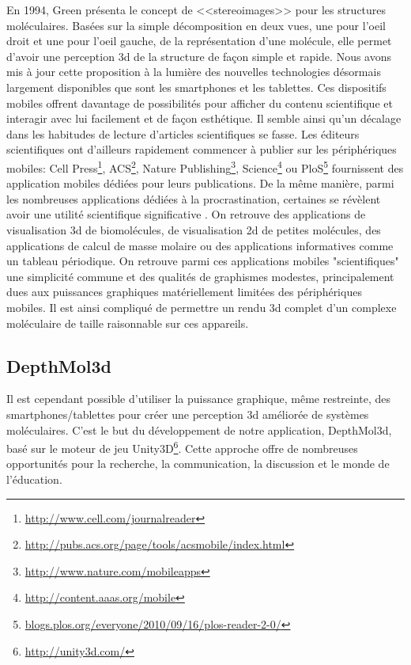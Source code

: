 En 1994, Green présenta le concept de <<stereoimages>> \cite{green_stereoimages_1994} pour les structures moléculaires. Basées sur la simple décomposition en deux vues, une pour l'oeil droit et une pour l'oeil gauche, de la représentation d'une molécule, elle permet d'avoir une perception 3d de la structure de façon simple et rapide. Nous avons mis à jour cette proposition à la lumière des nouvelles technologies désormais largement disponibles que sont les smartphones et les tablettes. Ces dispositifs mobiles offrent davantage de possibilités pour afficher du contenu scientifique et interagir avec lui facilement et de façon esthétique. Il semble ainsi qu'un décalage dans les habitudes de lecture d'articles scientifiques se fasse. Les éditeurs scientifiques ont d'ailleurs rapidement commencer à publier sur les périphériques mobiles: Cell Press\footnote{\url{http://www.cell.com/journalreader}}, ACS\footnote{\url{http://pubs.acs.org/page/tools/acsmobile/index.html}}, Nature Publishing\footnote{\url{http://www.nature.com/mobileapps}}, Science\footnote{\url{http://content.aaas.org/mobile}} ou PloS\footnote{\url{blogs.plos.org/everyone/2010/09/16/plos-reader-2-0/}} fournissent des application mobiles dédiées pour leurs publications. De la même manière, parmi les nombreuses applications dédiées à la procrastination, certaines se révèlent avoir une utilité scientifique significative \cite{powell_lab_2012}. On retrouve des applications de visualisation 3d de biomolécules, de visualisation 2d de petites molécules, des applications de calcul de masse molaire ou des applications informatives comme un tableau périodique. On retrouve parmi ces applications mobiles "scientifiques" une simplicité commune et des qualités de graphismes modestes, principalement dues aux puissances graphiques matériellement limitées des périphériques mobiles. Il est ainsi compliqué de permettre un rendu 3d complet d'un complexe moléculaire de taille raisonnable sur ces appareils.

\subsection{DepthMol3d}

Il est cependant possible d'utiliser la puissance graphique, même restreinte, des smartphones/tablettes pour créer une perception 3d améliorée de systèmes moléculaires. C'est le but du développement de notre application, DepthMol3d, basé sur le moteur de jeu Unity3D\footnote{\url{http://unity3d.com/}}. Cette approche offre de nombreuses opportunités pour la recherche, la communication, la discussion et le monde de l'éducation.

